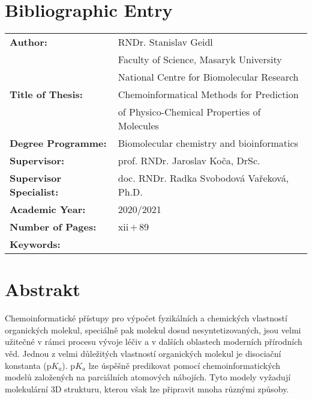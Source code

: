 \documentclass[11pt,b5paper,oneside,final]{book}
\begin{document}
\vfill
\section*{Bibliographic Entry}
\def\arraystretch{1.5}
\begin{tabular}{ lp{7.5cm} } 
  \textbf{Author:}                & RNDr. Stanislav Geidl \\
                                  & Faculty of Science, Masaryk University \\
                                  & National Centre for Biomolecular Research \\
  \textbf{Title of Thesis:}       & Chemoinformatical Methods for Prediction \\
                                  & of Physico-Chemical Properties of Molecules \\ 
  \textbf{Degree Programme:}      & Biomolecular chemistry and bioinformatics \\
  \textbf{Supervisor:}            & prof. RNDr. Jaroslav Koča, DrSc. \\
  \textbf{Supervisor Specialist:} & doc. RNDr. Radka Svobodová Vařeková, Ph.D. \\
  \textbf{Academic Year:}         & 2020/2021 \\
  \textbf{Number of Pages:}       & xii\,$+$\,89\\
  \textbf{Keywords:}              &  \\
\end{tabular}
\clearpage

\pagestyle{plain}

\section*{Abstrakt}
Chemoinformatické přístupy pro výpočet fyzikálních a chemických vlastností
organických molekul, speciálně pak molekul dosud nesyntetizovaných, jsou vel\-mi
užitečné v rámci procesu vývoje léčiv a v dalších oblastech moderních pří\-ro\-dních
věd. Jednou z velmi důležitých vlastností organických molekul je disociační
konstanta (p$K_a$). p$K_a$ lze úspěšně predikovat pomocí chemoinformatických
modelů založených na parciálních atomových nábojích. Tyto modely vyžadují
molekulární 3D strukturu, kterou však lze připravit mnoha různými způsoby.
\end{document}
